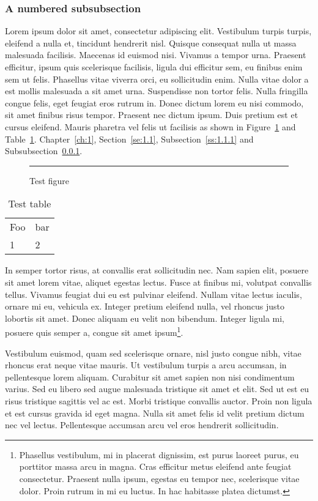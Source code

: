 \documentclass{abe}
\begin{document}
\subsubsection{A numbered subsubsection}
\label{sss:1.1.1.1}
Lorem ipsum dolor sit amet, consectetur adipiscing elit. Vestibulum turpis turpis, eleifend a nulla et, tincidunt hendrerit nisl. Quisque consequat nulla ut massa malesuada facilisis. Maecenas id euismod nisi. Vivamus a tempor urna. Praesent efficitur, ipsum quis scelerisque facilisis, ligula dui efficitur sem, eu finibus enim sem ut felis. Phasellus vitae viverra orci, eu sollicitudin enim. Nulla vitae dolor a est mollis malesuada a sit amet urna. Suspendisse non tortor felis. Nulla fringilla congue felis, eget feugiat eros rutrum in. Donec dictum lorem eu nisi commodo, sit amet finibus risus tempor. Praesent nec dictum ipsum. Duis pretium est et cursus eleifend. Mauris pharetra vel felis ut facilisis as shown in Figure~\ref{fig:test} and Table~\ref{table:test}. Chapter~\ref{ch:1}, Section~\ref{se:1.1}, Subsection~\ref{ss:1.1.1} and Subsubsection~\ref{sss:1.1.1.1}.

\begin{figure}[htbp]
\rule{2cm}{2cm}
\caption{Test figure}
\label{fig:test}
\end{figure}

\begin{table}[htbp]
\caption{Test table}
\label{table:test}
\begin{tabular}{ll}
Foo & bar \\
1 & 2 \\
\end{tabular}
\end{table}

In semper tortor risus, at convallis erat sollicitudin nec. Nam sapien elit, posuere sit amet lorem vitae, aliquet egestas lectus. Fusce at finibus mi, volutpat convallis tellus. Vivamus feugiat dui eu est pulvinar eleifend. Nullam vitae lectus iaculis, ornare mi eu, vehicula ex. Integer pretium eleifend nulla, vel rhoncus justo lobortis sit amet. Donec aliquam eu velit non bibendum. Integer ligula mi, posuere quis semper a, congue sit amet ipsum\footnote{Phasellus vestibulum, mi in placerat dignissim, est purus laoreet purus, eu porttitor massa arcu in magna. Cras efficitur metus eleifend ante feugiat consectetur. Praesent nulla ipsum, egestas eu tempor nec, scelerisque vitae dolor. Proin rutrum in mi eu luctus. In hac habitasse platea dictumst.}.

Vestibulum euismod, quam sed scelerisque ornare, nisl justo congue nibh, vitae rhoncus erat neque vitae mauris. Ut vestibulum turpis a arcu accumsan, in pellentesque lorem aliquam. Curabitur sit amet sapien non nisi condimentum varius. Sed eu libero sed augue malesuada tristique sit amet et elit. Sed ut est eu risus tristique sagittis vel ac est. Morbi tristique convallis auctor. Proin non ligula et est cursus gravida id eget magna. Nulla sit amet felis id velit pretium dictum nec vel lectus. Pellentesque accumsan arcu vel eros hendrerit sollicitudin. 
\end{document}
